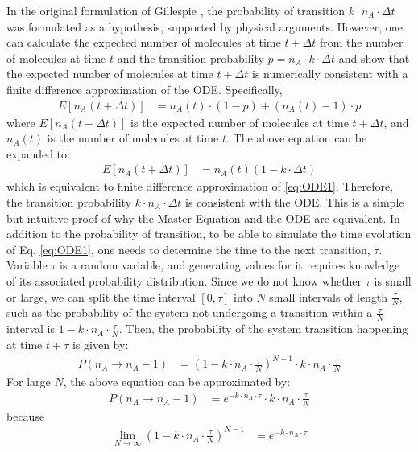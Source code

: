 \documentclass[12pt]{article}
\begin{document}
In the original formulation of Gillespie \cite{Gillespie1977}, the probability of transition $k \cdot n_A \cdot \Delta t$ was formulated as a hypothesis, supported by physical arguments. However, one can calculate the expected number of molecules at time $t+\Delta t$ from the number of molecules at time $t$ and the transition probability $p=n_A \cdot k \cdot \Delta t$ and show that the expected number of molecules at time $t+\Delta t$ is numerically consistent with a finite difference approximation of the ODE.  Specifically,
\begin{align}
E[n_A(t+\Delta t)] &= n_A(t) \cdot (1-p) + (n_A(t)-1) \cdot p
\label{eq:expectation}
\end{align}
where $E[n_A(t+\Delta t)]$ is the expected number of molecules at time $t+\Delta t$, and $n_A(t)$ is the number of molecules at time $t$.  The above equation can be expanded to:
\begin{align}
E[n_A(t+\Delta t)] &= n_A(t) (1-k  \cdot \Delta t) 
\label{eq:expectation2}
\end{align}
which is equivalent to finite difference approximation of \ref{eq:ODE1}.  Therefore, the transition probability $k \cdot n_A \cdot \Delta t$ is consistent with the ODE.  This is a simple but intuitive proof of why the Master Equation and the ODE are equivalent.  In addition to the probability of transition, to be able to simulate the time evolution of Eq. \ref{eq:ODE1}, one needs to determine the time to the next transition, $\tau$. Variable $\tau$ is a random variable, and generating values for it requires knowledge of its associated probability distribution.  Since we do not know whether $\tau$ is small or large, we can split the time interval $[0,\tau]$ into $N$ small intervals of length $\frac {\tau} {N}$, such as the probability of the system not undergoing a transition within a $\frac {\tau} {N}$ interval is $1-k \cdot n_A \cdot \frac {\tau} {N}$.  Then, the probability of the system transition happening at time $t+\tau$ is given by:
\begin{align}
P(n_A \rightarrow n_A-1) &= (1-k \cdot n_A \cdot \frac {\tau} {N})^{N-1} \cdot k \cdot n_A \cdot \frac {\tau} {N}
\label{eq:prob2}
\end{align}
For large $N$, the above equation can be approximated by:
\begin{align}
P(n_A \rightarrow n_A-1) &= e^{-k \cdot n_A \cdot \tau} \cdot k \cdot n_A \cdot \frac \tau N
\label{eq:prob3}
\end{align}
because 
\begin{align}
\lim_{N \to \infty} (1-k \cdot n_A \cdot \frac {\tau} {N})^{N-1} &= e^{-k \cdot n_A \cdot \tau}
\label{eq:limit}
\end{align}
\end{document}
